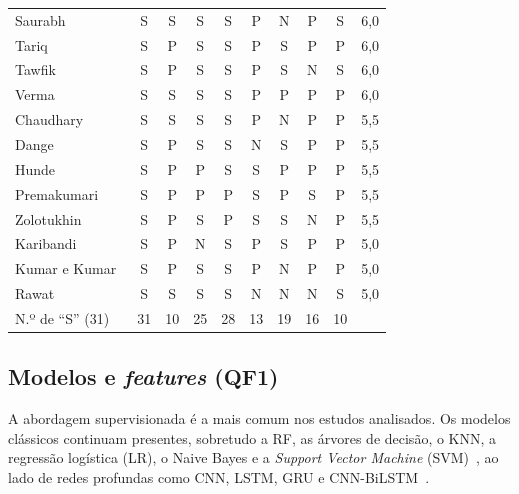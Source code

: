 \documentclass[conference,a4paper]{IEEEtran}
\begin{document}
\begin{table}[H]
\begin{tabular}{@{}lcccccccc c@{}}
Saurabh~\cite{saurabh2022mlaps}       & S & S & S & S & P & N & P & S & 6,0 \\
Tariq~\cite{tariq2025saegru} & S & P & S & S & P & S & P & P & 6,0 \\
Tawfik~\cite{tawfik2021internet}      & S & P & S & S & P & S & N & S & 6,0 \\
Verma~\cite{verma2024petrak} & S & S & S & S & P & P & P & P & 6,0 \\
Chaudhary~\cite{Chaudhary2025}      & S & S & S & S & P & N & P & P & 5,5 \\
Dange~\cite{dange2025dual}            & S & P & S & S & N & S & P & P & 5,5 \\
Hunde~\cite{hunde2026rankshield}      & S & P & P & S & S & P & P & P & 5,5 \\
Premakumari~\cite{premakumari2025qlearning} & S & P & P & P & S & P & S & P & 5,5 \\
Zolotukhin~\cite{zolotukhin2021curious} & S & P & S & P & S & S & N & P & 5,5 \\
Karibandi~\cite{karibandi2025cyberdome} & S & P & N & S & P & S & P & P & 5,0 \\
Kumar e Kumar~\cite{kumar2025advanced} & S & P & S & S & P & N & P & P & 5,0 \\
Rawat~\cite{rawat2024intelligent}     & S & S & S & S & N & N & N & S & 5,0 \\
\midrule
N.º de ``S'' (31) & 31 & 10 & 25 & 28 & 13 & 19 & 16 & 10 & \\
\bottomrule
\end{tabular}
\end{table}

\subsection{Modelos e \textit{features} (QF1)}\label{sec:qf1}
A abordagem supervisionada é a mais comum nos estudos analisados. Os modelos clássicos
continuam presentes, sobretudo a RF, as árvores de decisão, o KNN, a regressão logística
(LR), o Naive Bayes e a \textit{Support Vector Machine}
(SVM)~\cite{ramirezmartinez2025p4,andrade2024ddos,dange2025dual,kponyo2020lightweight,saurabh2022mlaps,rawat2024intelligent,karam2025isaaf,hussain2026postquantum,mazhar2022ridps,garba2024sdn,verma2024petrak},
ao lado de redes profundas como CNN, LSTM, GRU e
CNN-BiLSTM~\cite{rose2022ideres,ibrahim2026purechain,tawfik2021internet,srilekha2025hybrid}.
\end{document}

